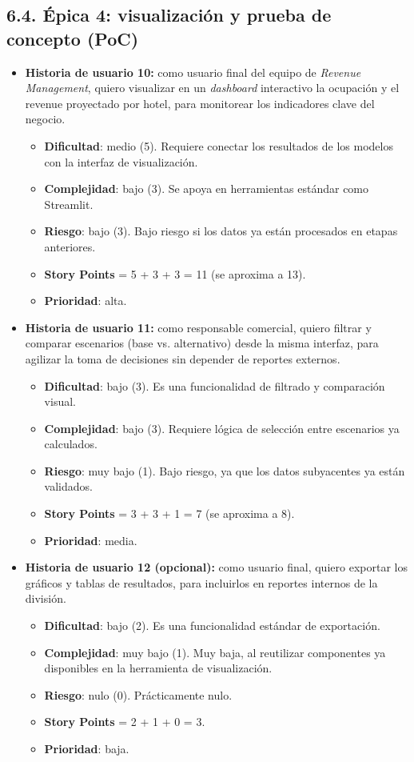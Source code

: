 \documentclass[
11pt, %
]{charter}
\begin{document}
\subsection*{6.4. Épica 4: visualización y prueba de concepto (PoC)}
\begin{itemize}
  \item \textbf{Historia de usuario 10:} como usuario final del equipo de \textit{Revenue Management}, quiero visualizar en un \textit{dashboard} interactivo la ocupación y el revenue proyectado por hotel, para monitorear los indicadores clave del negocio.
    \begin{itemize}
      \item \textbf{Dificultad}: medio (5). Requiere conectar los resultados de los modelos con la interfaz de visualización.
      \item \textbf{Complejidad}: bajo (3). Se apoya en herramientas estándar como Streamlit.
      \item \textbf{Riesgo}: bajo (3). Bajo riesgo si los datos ya están procesados en etapas anteriores.
      \item \textbf{Story Points} = 5 + 3 + 3 = 11 (se aproxima a 13).
      \item \textbf{Prioridad}: alta.
    \end{itemize}
  \item \textbf{Historia de usuario 11:} como responsable comercial, quiero filtrar y comparar escenarios (base vs. alternativo) desde la misma interfaz, para agilizar la toma de decisiones sin depender de reportes externos.
    \begin{itemize}
      \item \textbf{Dificultad}: bajo (3). Es una funcionalidad de filtrado y comparación visual.
      \item \textbf{Complejidad}: bajo (3). Requiere lógica de selección entre escenarios ya calculados.
      \item \textbf{Riesgo}: muy bajo (1). Bajo riesgo, ya que los datos subyacentes ya están validados.
      \item \textbf{Story Points} = 3 + 3 + 1 = 7 (se aproxima a 8).
      \item \textbf{Prioridad}: media.
    \end{itemize}
  \item \textbf{Historia de usuario 12 (opcional):} como usuario final, quiero exportar los gráficos y tablas de resultados, para incluirlos en reportes internos de la división.
    \begin{itemize}
      \item \textbf{Dificultad}: bajo (2). Es una funcionalidad estándar de exportación.
      \item \textbf{Complejidad}: muy bajo (1). Muy baja, al reutilizar componentes ya disponibles en la herramienta de visualización.
      \item \textbf{Riesgo}: nulo (0). Prácticamente nulo.
      \item \textbf{Story Points} = 2 + 1 + 0 = 3.
      \item \textbf{Prioridad}: baja.
    \end{itemize}
\end{itemize}
\end{document}
